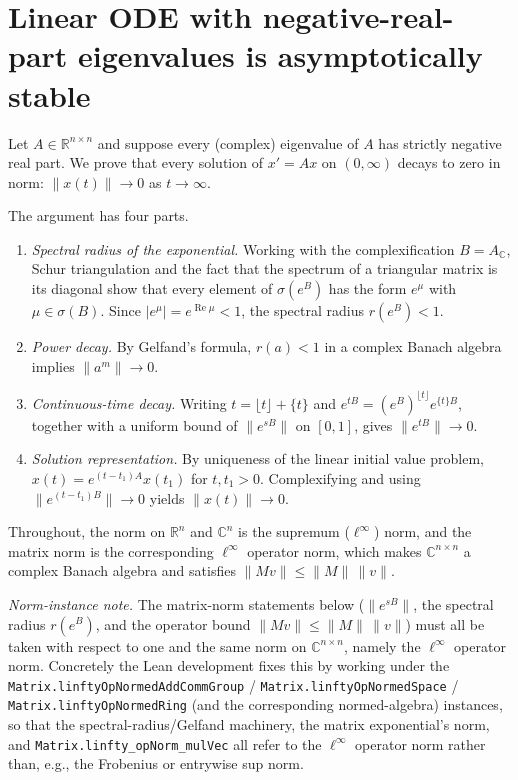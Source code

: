 


\section{Linear ODE with negative-real-part eigenvalues is asymptotically stable}

Let $A \in \mathbb{R}^{n \times n}$ and suppose every (complex) eigenvalue of $A$
has strictly negative real part. We prove that every solution of $x' = Ax$ on
$(0, \infty)$ decays to zero in norm: $\|x(t)\| \to 0$ as $t \to \infty$.

The argument has four parts.
\begin{enumerate}
    \item \emph{Spectral radius of the exponential.} Working with the
        complexification $B = A_{\mathbb{C}}$, Schur triangulation and the fact
        that the spectrum of a triangular matrix is its diagonal show that every
        element of $\sigma(e^{B})$ has the form $e^{\mu}$ with $\mu \in
        \sigma(B)$. Since $|e^{\mu}| = e^{\operatorname{Re}\mu} < 1$, the
        spectral radius $r(e^{B}) < 1$.
    \item \emph{Power decay.} By Gelfand's formula, $r(a) < 1$ in a complex
        Banach algebra implies $\|a^{m}\| \to 0$.
    \item \emph{Continuous-time decay.} Writing $t = \lfloor t \rfloor + \{t\}$
        and $e^{tB} = (e^{B})^{\lfloor t \rfloor} e^{\{t\}B}$, together with a
        uniform bound of $\|e^{sB}\|$ on $[0,1]$, gives $\|e^{tB}\| \to 0$.
    \item \emph{Solution representation.} By uniqueness of the linear initial
        value problem, $x(t) = e^{(t - t_1)A} x(t_1)$ for $t, t_1 > 0$.
        Complexifying and using $\|e^{(t-t_1)B}\| \to 0$ yields $\|x(t)\| \to 0$.
\end{enumerate}

Throughout, the norm on $\mathbb{R}^{n}$ and $\mathbb{C}^{n}$ is the supremum
($\ell^\infty$) norm, and the matrix norm is the corresponding $\ell^\infty$
operator norm, which makes $\mathbb{C}^{n \times n}$ a complex Banach algebra and
satisfies $\|Mv\| \le \|M\|\,\|v\|$.

\emph{Norm-instance note.} The matrix-norm statements below
($\|e^{sB}\|$, the spectral radius $r(e^{B})$, and the operator bound
$\|Mv\| \le \|M\|\,\|v\|$) must all be taken with respect to one and the same
norm on $\mathbb{C}^{n \times n}$, namely the $\ell^\infty$ operator norm.
Concretely the Lean development fixes this by working under the
\texttt{Matrix.linftyOpNormedAddCommGroup} / \texttt{Matrix.linftyOpNormedSpace} /
\texttt{Matrix.linftyOpNormedRing} (and the corresponding normed-algebra)
instances, so that the spectral-radius/Gelfand machinery, the matrix exponential's
norm, and \texttt{Matrix.linfty\_opNorm\_mulVec} all refer to the $\ell^\infty$
operator norm rather than, e.g., the Frobenius or entrywise sup norm.

